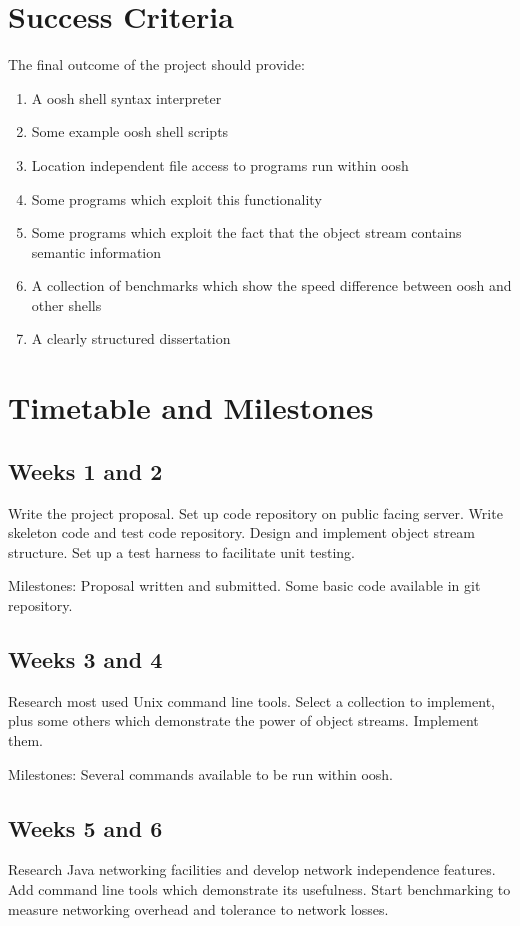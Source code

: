 \documentclass[12pt]{article}
\begin{document}
\section*{Success Criteria}
The final outcome of the project should provide:

\begin{enumerate}
\item A oosh shell syntax interpreter
\item Some example oosh shell scripts
\item Location independent file access to programs run within oosh
\item Some programs which exploit this functionality
\item Some programs which exploit the fact that the object stream
  contains semantic information
\item A collection of benchmarks which show the speed difference
  between oosh and other shells
\item A clearly structured dissertation
\end{enumerate}

\section*{Timetable and Milestones}

\subsection*{Weeks 1 and 2}
Write the project proposal. Set up code repository on public facing
server. Write skeleton code and test code repository. Design and
implement object stream structure. Set up a test harness to facilitate
unit testing.

Milestones: Proposal written and submitted. Some basic code available
in git repository.

\subsection*{Weeks 3 and 4}
Research most used Unix command line tools. Select a collection to
implement, plus some others which demonstrate the power of object
streams. Implement them.

Milestones: Several commands available to be run within oosh.

\subsection*{Weeks 5 and 6}
Research Java networking facilities and develop network independence
features. Add command line tools which demonstrate its
usefulness. Start benchmarking to measure networking overhead and
tolerance to network losses.
\end{document}
